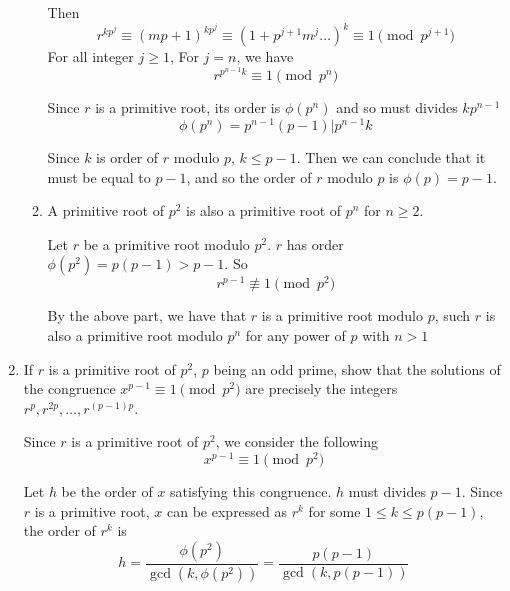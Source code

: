 \documentclass[12pt]{exam}
\theoremstyle{definition}
\begin{document}
\begin{enumerate}
\begin{enumerate}
\begin{answer}
                  Then 
                  \[
                        r^{kp^j} \equiv {(mp + 1)}^{kp^j} \equiv {(1 + p^{j+1} m^j \dots)}^k \equiv 1 \pmod {p^{j+1}}
                  \]
                  For all integer $j \geq 1$, For $j = n$, we have
                  \[
                        r^{p^{n-1}k} \equiv 1 \pmod {p^n}
                  \]

                  Since $r$ is a primitive root, its order is $\phi(p^n)$ and so must divides $kp^{n-1}$
                  \[
                        \phi(p^n) = p^{n-1}(p-1) | p^{n-1}k
                  \]

                  Since $k$ is order of $r$ modulo $p$, $k \leq p-1$. Then we can conclude that it must be equal to $p - 1$,
                  and so the order of $r$ modulo $p$ is $\phi(p) = p-1$.
            \end{answer}
            \item A primitive root of $p^2$ is also a primitive root of $p^n$ for $n \geq 2$. 
            \begin{answer}
                  Let $r$ be a primitive root modulo $p^2$. $r$ has order $\phi(p^2) = p(p-1) > p-1$.
                  So
                  \[
                        r^{p-1} \not\equiv 1 \pmod {p^2}
                  \]

                  By the above part, we have that $r$ is a primitive root modulo $p$, such $r$ is also a primitive root modulo $p^n$
                  for any power of $p$ with $n > 1$
            \end{answer}
      \end{enumerate}

      \item If $r$ is a primitive root of $p^2$,  $p$ being an  odd prime, show that the  solutions of  the congruence
      $x^{p-1} \equiv 1 \pmod {p^2}$ are precisely the integers $r^p,  r^{2p},  \dots ,  r^{(p-1)p}$. 
      \begin{answer}
            Since $r$ is a primitive root of $p^2$, we consider the following
            \[
                  x^{p-1} \equiv 1 \pmod {p^2}
            \]

            Let $h$ be the order of $x$ satisfying this congruence. $h$ must divides $p-1$. Since $r$ is a primitive root, $x$
            can be expressed as $r^k$ for some $1 \leq k \leq p(p-1)$, the order of $r^k$ is 
            \[
                  h = \frac{\phi(p^2)}{\gcd(k, \phi(p^2))} = \frac{p(p-1)}{\gcd(k, p(p-1))}
            \]


\end{answer}
\end{enumerate}
\end{document}
